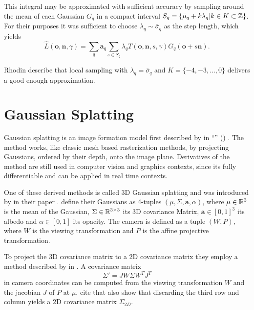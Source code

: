 \documentclass[a4paper, 11pt]{memoir}
\begin{document}
    This integral may be approximated with sufficient accuracy by sampling around the mean of each Gaussian $G_q$ in
    a compact interval $S_q = \{ \bar{\mu}_q + k\lambda_q | k \in K \subset \mathbb{Z} \}$. For their purposes it was sufficient
    to choose $\lambda_q \sim \bar{\sigma}_q$ as the step length, which yields
    \begin{equation}
        \hat{L}(\mathbf{o}, \mathbf{n}, \gamma) = \sum_q \mathbf{a}_q \sum_{s \in S_q}
            \lambda_q T(\mathbf{o}, \mathbf{n}, s, \gamma)G_q(\mathbf{o} + s\mathbf{n}).
        \label{eq:radiance}
    \end{equation}

    Rhodin \etal describe that local sampling with $\lambda_q = \bar{\sigma}_q$ and $K = \{ -4, -3, \dots, 0 \}$
    delivers a good enough approximation.

    \section{Gaussian Splatting}
    \label{sec:splatting}
    Gaussian splatting is an image formation model first described by \citeauthor{splatting} in \enquote{}
    (\citeyear{splatting}) \cite{splatting}. The method works, like classic mesh based rasterization methods, by projecting
    Gaussians, ordered by their depth, onto the image plane. Derivatives of the method are still used in computer vision
    and graphics contexts, since its fully differentiable and can be applied in real time contexts.

    One of these derived methods is called 3D Gaussian splatting and was introduced by \citeauthor{kerbl3Dgaussians} in
    their \citeyear{kerbl3Dgaussians} paper \cite{kerbl3Dgaussians}. \citeauthor{splatting}
    define their Gaussians as 4-tuples $(\mu, \Sigma, \mathbf{a}, \alpha)$, where $\mu \in \mathbb{R}^3$ is the mean of the
    Gaussian, $\Sigma \in \mathbb{R}^{3\times 3}$ its 3D covariance Matrix, $\mathbf{a} \in [0, 1]^3$ its albedo and
    $\alpha \in [0, 1]$ its opacity. The camera is defined as a tuple $(W, P)$, where $W$ is the viewing transformation
    and $P$ is the affine projective transformation.

    To project the 3D covariance matrix to a 2D covariance matrix they employ a method described by \citeauthor{volume_splatting}
    in \cite{volume_splatting}. A covariance matrix
    \begin{equation}
        \Sigma' = JW\Sigma W^TJ^T
    \end{equation}
    in camera coordinates can be computed from the viewing transformation $W$ and the jacobian $J$ of $P$ at $\mu$.
    \citeauthor{kerbl3Dgaussians} cite that \citeauthor{volume_splatting} also show that discarding the third row and
    column yields a 2D covariance matrix $\Sigma_{2D}$.
\end{document}
